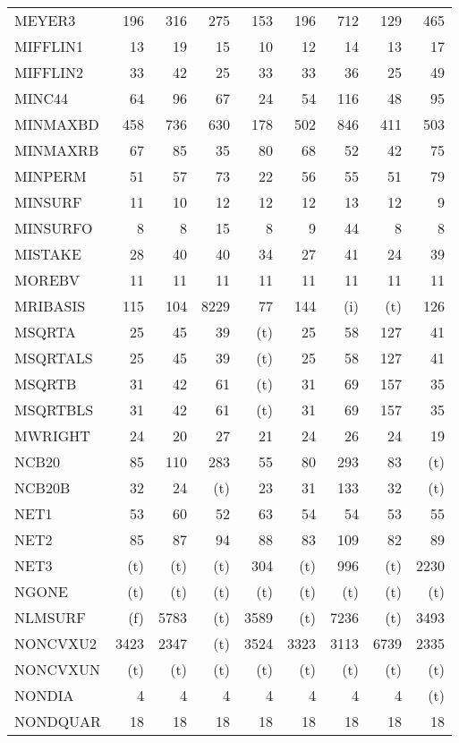 \documentclass[11pt,twoside]{article}
\begin{document}
{\begin{longtable}[c]{|l|r|r|r|r|r|r|r|r|}
 MEYER3 & 196 & 316 & 275 & 153 & 196 & 712 & 129 & 465 \\
 MIFFLIN1 & 13 & 19 & 15 & 10 & 12 & 14 & 13 & 17 \\
 MIFFLIN2 & 33 & 42 & 25 & 33 & 33 & 36 & 25 & 49 \\
 MINC44 & 64 & 96 & 67 & 24 & 54 & 116 & 48 & 95 \\
 MINMAXBD & 458 & 736 & 630 & 178 & 502 & 846 & 411 & 503 \\
 MINMAXRB & 67 & 85 & 35 & 80 & 68 & 52 & 42 & 75 \\
 MINPERM & 51 & 57 & 73 & 22 & 56 & 55 & 51 & 79 \\
 MINSURF & 11 & 10 & 12 & 12 & 12 & 13 & 12 & 9 \\
 MINSURFO & 8 & 8 & 15 & 8 & 9 & 44 & 8 & 8 \\
 MISTAKE & 28 & 40 & 40 & 34 & 27 & 41 & 24 & 39 \\
 MOREBV & 11 & 11 & 11 & 11 & 11 & 11 & 11 & 11 \\
 MRIBASIS & 115 & 104 & 8229 & 77 & 144 & (i) & (t) & 126 \\
 MSQRTA & 25 & 45 & 39 & (t) & 25 & 58 & 127 & 41 \\
 MSQRTALS & 25 & 45 & 39 & (t) & 25 & 58 & 127 & 41 \\
 MSQRTB & 31 & 42 & 61 & (t) & 31 & 69 & 157 & 35 \\
 MSQRTBLS & 31 & 42 & 61 & (t) & 31 & 69 & 157 & 35 \\
 MWRIGHT & 24 & 20 & 27 & 21 & 24 & 26 & 24 & 19 \\
 NCB20 & 85 & 110 & 283 & 55 & 80 & 293 & 83 & (t) \\
 NCB20B & 32 & 24 & (t) & 23 & 31 & 133 & 32 & (t) \\
 NET1 & 53 & 60 & 52 & 63 & 54 & 54 & 53 & 55 \\
 NET2 & 85 & 87 & 94 & 88 & 83 & 109 & 82 & 89 \\
 NET3 & (t) & (t) & (t) & 304 & (t) & 996 & (t) & 2230 \\
 NGONE & (t) & (t) & (t) & (t) & (t) & (t) & (t) & (t) \\
 NLMSURF & (f) & 5783 & (t) & 3589 & (t) & 7236 & (t) & 3493 \\
 NONCVXU2 & 3423 & 2347 & (t) & 3524 & 3323 & 3113 & 6739 & 2335 \\
 NONCVXUN & (t) & (t) & (t) & (t) & (t) & (t) & (t) & (t) \\
 NONDIA & 4 & 4 & 4 & 4 & 4 & 4 & 4 & (t) \\
 NONDQUAR & 18 & 18 & 18 & 18 & 18 & 18 & 18 & 18 \\

\end{longtable}}
\end{document}
